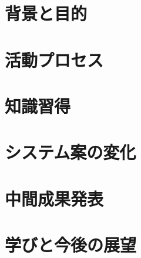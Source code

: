 \documentclass[openany,11pt,papersize]{jsbook}
\begin{document}
%
\maketitle

\frontmatter



\tableofcontents%


\mainmatter%

\chapter{背景と目的}



\chapter{活動プロセス}



\chapter{知識習得}



\chapter{システム案の変化}



\chapter{中間成果発表}



\chapter{学びと今後の展望}

\end{document}
